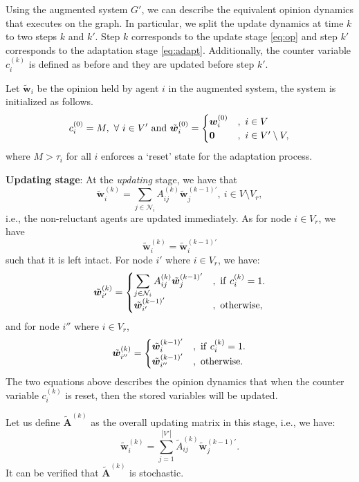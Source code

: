 \documentclass[letter]{article}
\theoremstyle{remark}
\begin{document}
Using the augmented system $G'$, we can describe the equivalent opinion dynamics that executes on the graph. In particular, we split the update dynamics at time $k$ to two steps $k$ and $k'$. Step $k$ corresponds to the update stage \eqref{eq:op} and step $k'$ corresponds to the adaptation stage \eqref{eq:adapt}. 
Additionally, the counter variable $c_i^{(k)}$ is defined as before and they are updated before step $k'$. 

Let $\tilde{ \bm w}_i$ be the opinion held by agent $i$ in the augmented system, the system is initialized as follows.
\[
c_i^{(0)} = M,~\forall~ i \in V'~{\rm and}~\tilde{ \bm w}_i^{(0)} = \begin{cases} { \bm w}_i^{(0)} &,~i \in V \\
 {\bf 0} &,~i \in V' \setminus V, \end{cases}
\]
where $M > \tau_i$ for all $i$ enforces a `reset' state for the adaptation process. 

\textbf{Updating stage}: At the \emph{updating} stage, we have that 
\[
\tilde{\bm w}_i^{(k)} = \sum_{j \in \mathcal{N}_i} A_{ij}^{(k)} \tilde{\bm w}_j^{(k-1)'},~i \in V \setminus V_r,
\]
i.e., the non-reluctant agents are updated immediately. 
As for node $i \in V_r$, we have $$\tilde{\bm w}_i^{(k)} = \tilde{\bm w}_i^{(k-1)'}$$ such that it is left intact. 
For node $i'$ where $i \in V_r$, we have:
\[
\tilde{\bm w}_{i'}^{(k)} = \begin{cases}
\displaystyle \sum_{j \in \mathcal{N}_i} A_{ij}^{(k)} \tilde{\bm w}_j^{(k-1)'}&,~{\rm if}~c_i^{(k)} = 1. \\
\tilde{\bm w}_{i'}^{(k-1)'}&,~{\rm otherwise},
\end{cases}
\]
and for node $i''$ where $i \in V_r$, 
\[
\tilde{\bm w}_{i''}^{(k)} = \begin{cases}
\tilde{\bm w}_{i}^{(k-1)'}&,~{\rm if}~c_i^{(k)} = 1. \\
\tilde{\bm w}_{i''}^{(k-1)'}&,~{\rm otherwise}.
\end{cases}
\]
The two equations above describes the opinion dynamics that when the counter variable $c_i^{(k)}$ is reset, then the stored variables will be updated. 

Let us define $\tilde{\bm A}^{(k)}$ as the overall updating matrix in this stage, i.e., we have:
\[
\tilde{\bm w}_i^{(k)} = \sum_{j=1}^{|V'|} \tilde{A}_{ij}^{(k)} \tilde{\bm w}_j^{(k-1)'}.
\]
It can be verified that $\tilde{\bm A}^{(k)}$ is stochastic. 
\end{document}

